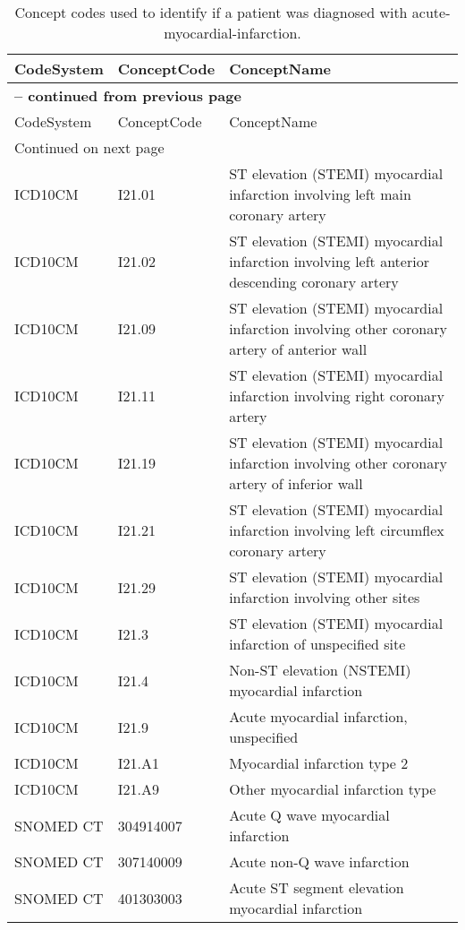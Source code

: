 \begin{longtable}{p{}p{}p{}}
\caption{Concept codes used to identify if a patient was diagnosed with acute-myocardial-infarction.} \\ 
 CodeSystem & ConceptCode & ConceptName \\ 
  \hline 
\endfirsthead 
\multicolumn{3}{p{\textwidth}}{{ \bfseries \tablename \thetable{} -- continued from previous page}} \\ 
\hline CodeSystem & ConceptCode & ConceptName \\ \hline 
\endhead 
\hline \multicolumn{3}{p{\textwidth}}{{Continued on next page}} \\ \hline 
\endfoot 
\hline 
\endlastfoot 
 \hline
ICD10CM & I21.01 & ST elevation (STEMI) myocardial infarction involving left main coronary artery \\ 
  ICD10CM & I21.02 & ST elevation (STEMI) myocardial infarction involving left anterior descending coronary artery \\ 
  ICD10CM & I21.09 & ST elevation (STEMI) myocardial infarction involving other coronary artery of anterior wall \\ 
  ICD10CM & I21.11 & ST elevation (STEMI) myocardial infarction involving right coronary artery \\ 
  ICD10CM & I21.19 & ST elevation (STEMI) myocardial infarction involving other coronary artery of inferior wall \\ 
  ICD10CM & I21.21 & ST elevation (STEMI) myocardial infarction involving left circumflex coronary artery \\ 
  ICD10CM & I21.29 & ST elevation (STEMI) myocardial infarction involving other sites \\ 
  ICD10CM & I21.3 & ST elevation (STEMI) myocardial infarction of unspecified site \\ 
  ICD10CM & I21.4 & Non-ST elevation (NSTEMI) myocardial infarction \\ 
  ICD10CM & I21.9 & Acute myocardial infarction, unspecified \\ 
  ICD10CM & I21.A1 & Myocardial infarction type 2 \\ 
  ICD10CM & I21.A9 & Other myocardial infarction type \\ 
  SNOMED CT & 304914007 & Acute Q wave myocardial infarction \\ 
  SNOMED CT & 307140009 & Acute non-Q wave infarction \\ 
  SNOMED CT & 401303003 & Acute ST segment elevation myocardial infarction \\ 

\end{longtable}
